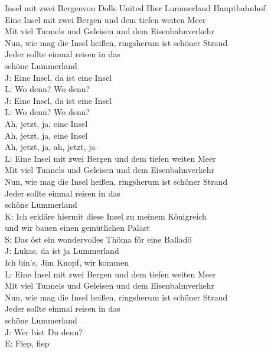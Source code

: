 
\begin{lied}{Insel mit zwei Bergen}{von Dolls United}
Hier Lummerland Hauptbahnhof\\
Eine Insel mit zwei Bergen und dem tiefen weiten Meer\\
Mit viel Tunnels und Geleisen und dem Eisenbahnverkehr\\
Nun, wie mag die Insel heißen, ringsherum ist schöner Strand\\
Jeder sollte einmal reisen in das\\
schöne Lummerland\\
J: Eine Insel, da ist eine Insel\\
L: Wo denn? Wo denn?\\
J: Eine Insel, da ist eine Insel\\
L: Wo denn? Wo denn?\\
Ah, jetzt, ja, eine Insel\\
Ah, jetzt, ja, eine Insel\\
Ah, jetzt, ja, ah, jetzt, ja\\
L: Eine Insel mit zwei Bergen und dem tiefen weiten Meer\\
Mit viel Tunnels und Geleisen und dem Eisenbahnverkehr\\
Nun, wie mag die Insel heißen, ringsherum ist schöner Strand\\
Jeder sollte einmal reisen in das\\
schöne Lummerland\\
K: Ich erkläre hiermit diese Insel zu meinem Königreich\\
und wir bauen einen gemütlichen Palast\\
S: Das öst ein wondervolles Thöma för eine Balladö\\
J: Lukas, da ist ja Lummerland\\
Ich bin’s, Jim Knopf, wir kommen\\
L: Eine Insel mit zwei Bergen und dem tiefen weiten Meer\\
Mit viel Tunnels und Geleisen und dem Eisenbahnverkehr\\
Nun, wie mag die Insel heißen, ringsherum ist schöner Strand\\
Jeder sollte einmal reisen in das\\
schöne Lummerland\\
J: Wer bist Du denn?\\
E: Fiep, fiep\\

\end{lied}
